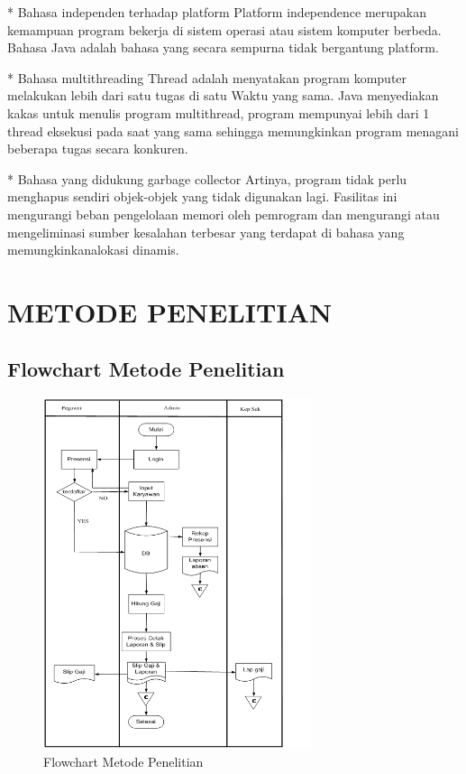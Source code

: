 \documentclass{jtetiproposalskripsi}
\begin{document}
*	Bahasa independen terhadap platform
Platform independence merupakan kemampuan program bekerja di sistem operasi atau sistem komputer berbeda. Bahasa Java adalah bahasa yang secara sempurna tidak bergantung platform.

*   Bahasa multithreading
Thread adalah menyatakan program komputer melakukan lebih dari satu tugas di satu  Waktu   yang   sama.   Java   menyediakan   kakas   untuk   menulis   program multithread,  program mempunyai   lebih dari  1  thread  eksekusi  pada  saat  yang sama   sehingga   memungkinkan   program   menagani   beberapa   tugas   secara konkuren.

*   Bahasa yang didukung garbage collector
Artinya,   program   tidak   perlu   menghapus   sendiri   objek-objek   yang   tidak digunakan   lagi.   Fasilitas   ini   mengurangi   beban   pengelolaan   memori   oleh pemrogram dan mengurangi atau mengeliminasi sumber kesalahan terbesar yang terdapat di bahasa yang memungkinkanalokasi dinamis.



\chapter{METODE PENELITIAN}

\section{Flowchart Metode Penelitian}
\begin{figure}[h]
\centering 
 \includegraphics[width=0.7\textwidth]{gambar/1}  
 \caption{Flowchart Metode Penelitian}
\end{figure}
\end{document}
